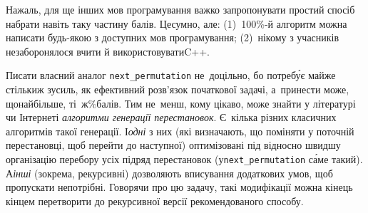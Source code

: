 
 На\nolinebreak[3] жаль, для ще інших мов програмування важко запропонувати простий спосіб набрати навіть таку частину балів. 
Це\nolinebreak[3] сумно, але: 
\linebreak[3]
(1)~100\%-й алгоритм можна написати будь-якою з доступних мов програмування; 
\linebreak[3]
(2)~нікому з учасників не\nolinebreak[3] заборонялося вчити й використовувати\nolinebreak[3] C++.

Писати власний аналог \verb"next_permutation" не~доцільно, бо потреб\'{у}є майже стільки\nolinebreak[3] ж зусиль, як ефективний розв'язок початкової задачі, а~принести може, щонайбільше, ті~ж\%\nolinebreak[3] балів. Тим не~менш, кому цікаво, може знайти у літературі чи Інтернеті \emph{алгоритми генерації перестановок}. 
%
Є~кілька різних класичних алгоритмів такої генерації. І\nolinebreak[3] \emph{одні} з них (які визначають, що поміняти у поточній перестановці, щоб перейти до наступної) оптимізовані під відносно швидшу організацію перебору усіх підряд перестановок (у\nolinebreak[3] \verb"next_permutation" с\'{а}ме такий). А\nolinebreak[3] \emph{інші} (зокрема, рекурсивні) дозволяють вписування додаткових умов, щоб пропускати непотрібні. Говорячи про цю задачу, такі модифікації можна кінець кінцем перетворити до рекурсивної версії 
рекомендованого способу.
